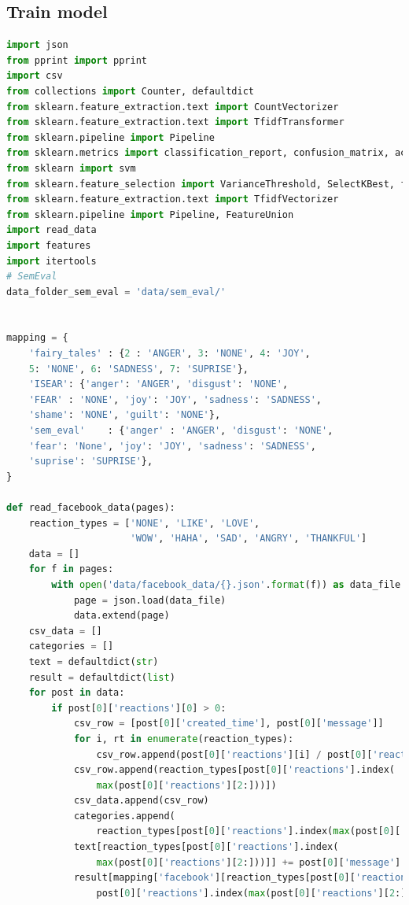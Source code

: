 \documentclass[
10pt, %
a4paper, %
oneside, %
headinclude,footinclude, %
BCOR5mm, %
]{scrartcl}
\begin{document}
\subsection{Train model}
\begin{lstlisting}[language=Python]
import json
from pprint import pprint
import csv
from collections import Counter, defaultdict
from sklearn.feature_extraction.text import CountVectorizer
from sklearn.feature_extraction.text import TfidfTransformer
from sklearn.pipeline import Pipeline
from sklearn.metrics import classification_report, confusion_matrix, accuracy_score,f1_score
from sklearn import svm
from sklearn.feature_selection import VarianceThreshold, SelectKBest, f_classif
from sklearn.feature_extraction.text import TfidfVectorizer
from sklearn.pipeline import Pipeline, FeatureUnion
import read_data
import features
import itertools
# SemEval
data_folder_sem_eval = 'data/sem_eval/'


mapping = {
    'fairy_tales' : {2 : 'ANGER', 3: 'NONE', 4: 'JOY', 
    5: 'NONE', 6: 'SADNESS', 7: 'SUPRISE'},
    'ISEAR': {'anger': 'ANGER', 'disgust': 'NONE', 
    'FEAR' : 'NONE', 'joy': 'JOY', 'sadness': 'SADNESS',
    'shame': 'NONE', 'guilt': 'NONE'},
    'sem_eval'    : {'anger' : 'ANGER', 'disgust': 'NONE',
    'fear': 'None', 'joy': 'JOY', 'sadness': 'SADNESS',
    'suprise': 'SUPRISE'},
}

def read_facebook_data(pages):
    reaction_types = ['NONE', 'LIKE', 'LOVE',
                      'WOW', 'HAHA', 'SAD', 'ANGRY', 'THANKFUL']
    data = []
    for f in pages:
        with open('data/facebook_data/{}.json'.format(f)) as data_file:
            page = json.load(data_file)
            data.extend(page)
    csv_data = []
    categories = []
    text = defaultdict(str)
    result = defaultdict(list)
    for post in data:
        if post[0]['reactions'][0] > 0:
            csv_row = [post[0]['created_time'], post[0]['message']]
            for i, rt in enumerate(reaction_types):
                csv_row.append(post[0]['reactions'][i] / post[0]['reactions'][0])
            csv_row.append(reaction_types[post[0]['reactions'].index(
                max(post[0]['reactions'][2:]))])
            csv_data.append(csv_row)
            categories.append(
                reaction_types[post[0]['reactions'].index(max(post[0]['reactions'][2:]))])
            text[reaction_types[post[0]['reactions'].index(
                max(post[0]['reactions'][2:]))]] += post[0]['message']
            result[mapping['facebook'][reaction_types[post[0]['reactions'].index(max(post[0]['reactions'][2:]))]]].append((mapping['facebook'][reaction_types[
                post[0]['reactions'].index(max(post[0]['reactions'][2:]))]], post[0]['message'], max(post[0]['reactions'][2:]) / post[0]['reactions'][0]))


\end{lstlisting}
\end{document}
